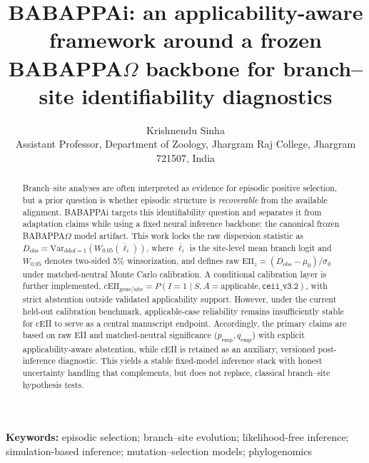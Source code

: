\documentclass[11pt]{article}
\title{\textbf{BABAPPAi: an applicability-aware framework around a frozen BABAPPA$\Omega$ backbone for branch--site identifiability diagnostics}}
\author{
Krishnendu Sinha\\
Assistant Professor, Department of Zoology, Jhargram Raj College, Jhargram 721507, India
}
\date{}
\begin{document}
\maketitle

\begin{abstract}
Branch--site analyses are often interpreted as evidence for episodic positive selection, but a prior question is whether episodic structure is \emph{recoverable} from the available alignment. BABAPPAi targets this identifiability question and separates it from adaptation claims while using a fixed neural inference backbone: the canonical frozen BABAPPA$\Omega$ model artifact. This work locks the raw dispersion statistic as $D_{\mathrm{obs}}=\mathrm{Var}_{\mathrm{ddof}=1}(W_{0.05}(\overline{\ell}_i))$, where $\overline{\ell}_i$ is the site-level mean branch logit and $W_{0.05}$ denotes two-sided 5\% winsorization, and defines raw $ \mathrm{EII}_z=(D_{\mathrm{obs}}-\mu_0)/\sigma_0 $ under matched-neutral Monte Carlo calibration. A conditional calibration layer is further implemented, $c\mathrm{EII}_{\mathrm{gene/site}}=P(I=1\mid S,A=\text{applicable},\texttt{ceii\_v3.2})$, with strict abstention outside validated applicability support. However, under the current held-out calibration benchmark, applicable-case reliability remains insufficiently stable for cEII to serve as a central manuscript endpoint. Accordingly, the primary claims are based on raw EII and matched-neutral significance ($p_{\mathrm{emp}},q_{\mathrm{emp}}$) with explicit applicability-aware abstention, while cEII is retained as an auxiliary, versioned post-inference diagnostic. This yields a stable fixed-model inference stack with honest uncertainty handling that complements, but does not replace, classical branch--site hypothesis tests.
\end{abstract}

\noindent\textbf{Keywords:} episodic selection; branch--site evolution; likelihood-free inference; simulation-based inference; mutation--selection models; phylogenomics
\end{document}

